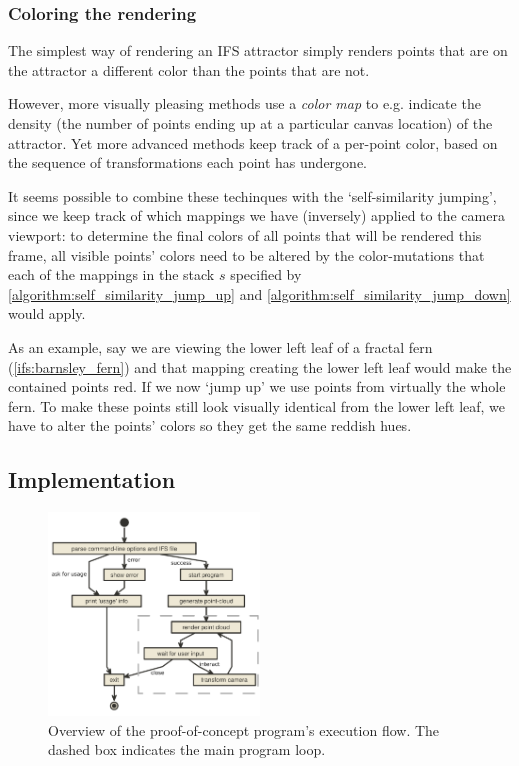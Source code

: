 \documentclass[11pt]{article}
\begin{document}
\subsubsection{Coloring the rendering}
\label{sec:org4d787eb}
\label{subsection:coloring}

The simplest way of rendering an IFS attractor simply renders points that are on the attractor a different color
than the points that are not.

However, more visually pleasing methods use a \emph{color map} to e.g. indicate the density (the number of points ending up at a particular canvas location) of the attractor.
Yet more advanced methods \cite{draves2003fractal} keep track of a per-point color, based on the sequence of transformations each point has undergone.

It seems possible to combine these techinques with the `self-similarity jumping', since we keep track of which mappings we have (inversely) applied to the camera viewport:
to determine the final colors of all points that will be rendered this frame, 
all visible points' colors need to be altered by the color-mutations that each of the mappings in the stack \(s\) specified by \autoref{algorithm:self_similarity_jump_up} and \autoref{algorithm:self_similarity_jump_down} would apply.

As an example, say we are viewing the lower left leaf of a fractal fern (\autoref{ifs:barnsley_fern}) and that mapping creating the lower left leaf would make the contained points red. 
If we now `jump up' we use points from virtually the whole fern.
To make these points still look visually identical from the lower left leaf, we have to alter the points' colors so they get the same reddish hues.

\subsection{Implementation}
\label{sec:org7052480}

\begin{figure}
  \centering
  \includegraphics[width=0.5\textwidth]{figures/program_execution}
  \caption{Overview of the proof-of-concept program's execution flow. The dashed box indicates the main program loop.}
\label{figure:program_flow}
\end{figure}
\end{document}
